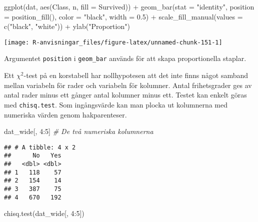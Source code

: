 \documentclass[
]{book}
\newenvironment{Shaded}{\begin{snugshade}}{\end{snugshade}}
\newcommand{\AttributeTok}[1]{\textcolor[rgb]{0.77,0.63,0.00}{#1}}
\newcommand{\CommentTok}[1]{\textcolor[rgb]{0.56,0.35,0.01}{\textit{#1}}}
\newcommand{\DecValTok}[1]{\textcolor[rgb]{0.00,0.00,0.81}{#1}}
\newcommand{\FloatTok}[1]{\textcolor[rgb]{0.00,0.00,0.81}{#1}}
\newcommand{\FunctionTok}[1]{\textcolor[rgb]{0.00,0.00,0.00}{#1}}
\newcommand{\NormalTok}[1]{#1}
\newcommand{\SpecialCharTok}[1]{\textcolor[rgb]{0.00,0.00,0.00}{#1}}
\newcommand{\StringTok}[1]{\textcolor[rgb]{0.31,0.60,0.02}{#1}}
\theoremstyle{definition}
\theoremstyle{definition}
\theoremstyle{definition}
\theoremstyle{definition}
\theoremstyle{remark}
\begin{document}
\begin{Shaded}
\begin{Highlighting}[]
\FunctionTok{ggplot}\NormalTok{(dat, }\FunctionTok{aes}\NormalTok{(Class, n, }\AttributeTok{fill =}\NormalTok{ Survived)) }\SpecialCharTok{+}
  \FunctionTok{geom\_bar}\NormalTok{(}\AttributeTok{stat =} \StringTok{"identity"}\NormalTok{, }\AttributeTok{position =} \FunctionTok{position\_fill}\NormalTok{(), }
           \AttributeTok{color =} \StringTok{"black"}\NormalTok{, }\AttributeTok{width =} \FloatTok{0.5}\NormalTok{) }\SpecialCharTok{+}
  \FunctionTok{scale\_fill\_manual}\NormalTok{(}\AttributeTok{values =} \FunctionTok{c}\NormalTok{(}\StringTok{"black"}\NormalTok{, }\StringTok{"white"}\NormalTok{)) }\SpecialCharTok{+}
  \FunctionTok{ylab}\NormalTok{(}\StringTok{"Proportion"}\NormalTok{)}
\end{Highlighting}
\end{Shaded}

\begin{center}\texttt{[image: R-anvisningar\_files/figure-latex/unnamed-chunk-151-1]} \end{center}

Argumentet \texttt{position} i \texttt{geom\_bar} används för att skapa proportionella staplar.

Ett \(\chi^2\)-test på en korstabell har nollhypotesen att det inte finns något samband mellan variabeln för rader och variabeln för kolumner. Antal frihetsgrader ges av antal rader minus ett gånger antal kolumner minus ett. Testet kan enkelt göras med \texttt{chisq.test}. Som ingångsvärde kan man plocka ut kolumnerna med numeriska värden genom hakparenteser.

\begin{Shaded}
\begin{Highlighting}[]
\NormalTok{dat\_wide[, }\DecValTok{4}\SpecialCharTok{:}\DecValTok{5}\NormalTok{] }\CommentTok{\# De två numeriska kolumnerna}
\end{Highlighting}
\end{Shaded}

\begin{verbatim}
## # A tibble: 4 x 2
##      No   Yes
##   <dbl> <dbl>
## 1   118    57
## 2   154    14
## 3   387    75
## 4   670   192
\end{verbatim}

\begin{Shaded}
\begin{Highlighting}[]
\FunctionTok{chisq.test}\NormalTok{(dat\_wide[, }\DecValTok{4}\SpecialCharTok{:}\DecValTok{5}\NormalTok{])}
\end{Highlighting}
\end{Shaded}
\end{document}
